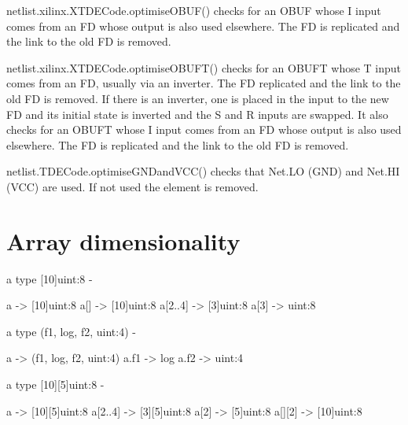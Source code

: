 \documentclass[10pt,a4paper,twoside,fleqn]{book}
\begin{document}
        netlist.xilinx.XTDECode.optimiseOBUF() checks for an OBUF whose I
        input comes from an FD whose output is also used elsewhere. The FD
        is replicated and the link to the old FD is removed.
        
        netlist.xilinx.XTDECode.optimiseOBUFT() checks for an OBUFT whose T
        input comes from an FD, usually via an inverter. The FD replicated
        and the link to the old FD is removed. If there is an inverter, one
        is placed in the input to the new FD and its initial state is
        inverted and the S and R inputs are swapped. It also checks for an
        OBUFT whose I input comes from an FD whose output is also used
        elsewhere. The FD is replicated and the link to the old FD is
        removed.
        
        netlist.TDECode.optimiseGNDandVCC() checks that Net.LO (GND) and
        Net.HI (VCC) are used. If not used the element is removed.








\appendix

\chapter{Array dimensionality}

    \begin{verbatimtab}
    a type [10]uint:8 -
    \end{verbatimtab}

    \begin{verbatimtab}
        a       ->  [10]uint:8
        a[]     ->  [10]uint:8
        a[2..4] ->  [3]uint:8
        a[3]    ->  uint:8
    \end{verbatimtab}


    \begin{verbatimtab}
    a type (f1, log, f2, uint:4) -
    \end{verbatimtab}

    \begin{verbatimtab}
        a       ->  (f1, log, f2, uint:4)
        a.f1    ->  log
        a.f2    ->  uint:4
    \end{verbatimtab}

    \begin{verbatimtab}
    a type [10][5]uint:8 -
    \end{verbatimtab}

    \begin{verbatimtab}
        a       ->  [10][5]uint:8
        a[2..4] ->  [3][5]uint:8
        a[2]    ->  [5]uint:8
        a[][2]  ->  [10]uint:8
    \end{verbatimtab}
\end{document}
